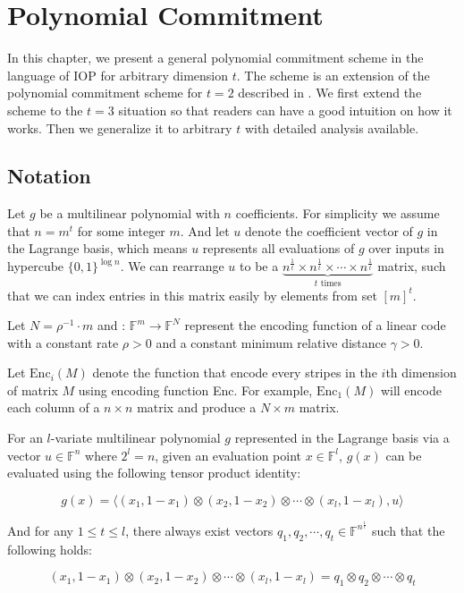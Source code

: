 \chapter{Polynomial Commitment}

In this chapter, we present a general polynomial commitment scheme in the language of IOP for arbitrary dimension $t$. The scheme is an extension of the polynomial commitment scheme for $t=2$ described in \cite{brakedown}. We first extend the scheme to the $t=3$ situation so that readers can have a good intuition on how it works. Then we generalize it to arbitrary $t$ with detailed analysis available.

\section{Notation}

Let $g$ be a multilinear polynomial with $n$ coefficients. For simplicity we assume that $n = m^t$ for some integer $m$. And let $u$ denote the coefficient vector of $g$ in the Lagrange basis, which means $u$ represents all evaluations of $g$ over inputs in hypercube $\{0, 1\}^{\log n}$. 
We can rearrange $u$ to be a $\underbrace{n^{\frac{1}{t}} \times n^{\frac{1}{t}} \times \cdots \times n^{\frac{1}{t}}}_{t \text{ times}}$ matrix, such that we can index entries in this matrix easily by elements from set $[m]^t$.

Let $N = \rho^{-1} \cdot m$ and : $\mathbb{F}^m \rightarrow \mathbb{F}^N$ represent the encoding function of a linear code with a constant rate $\rho > 0$ and a constant minimum relative distance $\gamma > 0$.

Let $\text{Enc}_i(M)$ denote the function that encode every stripes in the $i$th dimension of matrix $M$ using encoding function Enc. For example, $\text{Enc}_1(M)$ will encode each column of a $n \times n $ matrix and produce a $N \times m$ matrix.

\begin{lemma}
\label{lemma:petq}

For an $l$-variate multilinear polynomial $g$ represented in the Lagrange basis via a vector $u \in \mathbb{F}^{n}$ where $2^l = n$, given an evaluation point $x \in \mathbb{F}^l$, $g(x)$ can be evaluated using the following tensor product identity: 

\[
    g(x) = \langle (x_1, 1-x_1) \otimes (x_2, 1-x_2) \otimes \cdots \otimes (x_l, 1-x_l) , u \rangle
\]

And for any $ 1 \le t  \le l$, there always exist vectors $q_1, q_2, \cdots , q_t \in \mathbb{F}^{n^{\frac{1}{t}}}$ such that the following holds:

\[
    (x_1, 1-x_1) \otimes (x_2, 1-x_2) \otimes \cdots \otimes (x_l, 1-x_l) = q_1 \otimes q_2 \otimes \cdots \otimes q_t
\]

\end{lemma}


